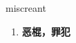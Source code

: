 
\begin{frame}
{\huge miscreant}
\begin{center}
\begin{enumerate}\Large
  \item \textbf{恶棍，罪犯}
\end{enumerate}
\end{center}
\end{frame}
